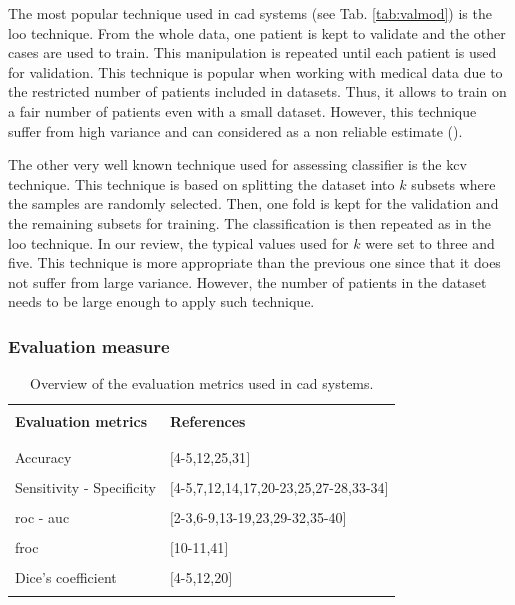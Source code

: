 The most popular technique used in \ac{cad} systems (see Tab. \ref{tab:valmod}) is the \acf{loo} technique. From the whole data, one patient is kept to validate and the other cases are used to train. This manipulation is repeated until each patient is used for validation. This technique is popular when working with medical data due to the restricted number of patients included in datasets. Thus, it allows to train on a fair number of patients even with a small dataset. However, this technique suffer from high variance and can considered as a non reliable estimate (\cite{Efron1983}).

The other very well known technique used for assessing classifier is the \acf{kcv} technique. This technique is based on splitting the dataset into $k$ subsets where the samples are randomly selected. Then, one fold is kept for the validation and the remaining subsets for training. The classification is then repeated as in the \ac{loo} technique. In our review, the typical values used for $k$ were set to three and five. This technique is more appropriate than the previous one since that it does not suffer from large variance. However, the number of patients in the dataset needs to be large enough to apply such technique.

\subsubsection{Evaluation measure}\label{subsubsec:eval}

\begin{table}
	\caption{Overview of the evaluation metrics used in \ac{cad} systems.}
	\small
	\begin{tabular}{p{.55\linewidth} p{.35\linewidth}}
		\hline \\ [-1.5ex]
		\textbf{Evaluation metrics} & \textbf{References} \\ \\ [-1.5ex]
		\hline \\ [-1.5ex]
		\quad Accuracy & $[$4-5,12,25,31$]$ \\ \\ [-1.5ex]
		\quad Sensitivity - Specificity & $[$4-5,7,12,14,17,20-23,25,27-28,33-34$]$ \\ \\ [-1.5ex]
		\quad \acs{roc} - \acs{auc} & $[$2-3,6-9,13-19,23,29-32,35-40$]$ \\ \\ [-1.5ex]
		\quad \acs{froc} & $[$10-11,41$]$ \\ \\ [-1.5ex]
		\quad Dice's coefficient & $[$4-5,12,20$]$ \\ \\ [-1.5ex]
		\hline
	\end{tabular}
	\label{tab:evatec}
\end{table}

